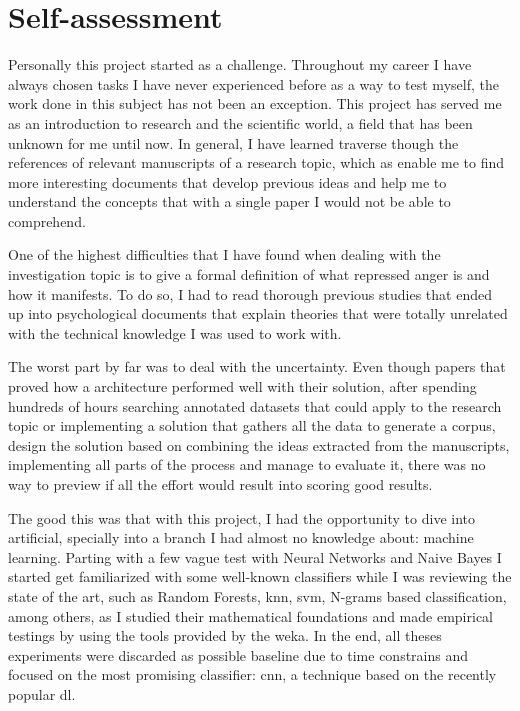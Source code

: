 \chapter{Self-assessment}

Personally this project started as a challenge. Throughout my career I have always chosen tasks I have never experienced before as a way to test myself, the work done in this subject has not been an exception. This project has served me as an introduction to research and the scientific world, a field that has been unknown for me until now. In general, I have learned traverse though the references of relevant manuscripts of a research topic, which as enable me to find more interesting documents that develop previous ideas and help me to understand the concepts that with a single paper I would not be able to comprehend.

One of the highest difficulties that I have found when dealing with the investigation topic is to give a formal definition of what repressed anger is and how it manifests. To do so, I had to read thorough previous studies that ended up into psychological documents that explain theories that were totally unrelated with the technical knowledge I was used to work with. 

The worst part by far was to deal with the uncertainty. Even though papers that proved how a architecture performed well with their solution, after spending hundreds of hours searching annotated datasets that could apply to the research topic or implementing a solution that gathers all the data to generate a corpus, design the solution based on combining the ideas extracted from the manuscripts, implementing all parts of the process and manage to evaluate it, there was no way to preview if all the effort would result into scoring good results.

The good this was that with this project, I had the opportunity to dive into artificial, specially into a branch I had almost no knowledge about: machine learning. Parting with a few vague test with Neural Networks and Naive Bayes I started get familiarized with some well-known classifiers while I was reviewing the state of the art, such as Random Forests, \acrshort{knn}, \acrshort{svm}, N-grams based classification, among others, as I studied their mathematical foundations and made empirical testings by using the tools provided by the \acrfull{weka}. In the end, all theses experiments were discarded as possible baseline due to time constrains and focused on the most promising classifier: \acrlong{cnn}, a technique based on the recently popular \acrlong{dl}.

